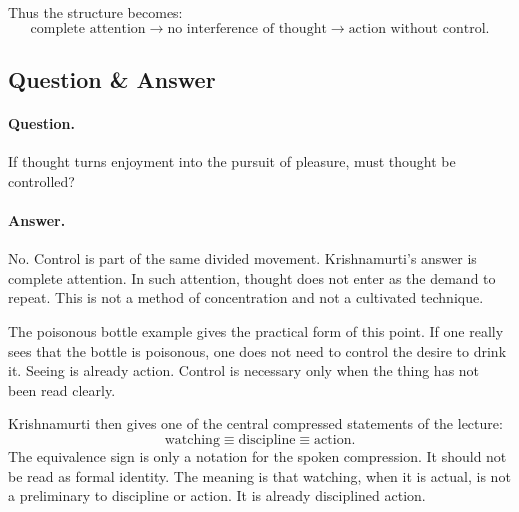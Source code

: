 Thus the structure becomes:
\begin{equation}
\text{complete attention}
\longrightarrow
\text{no interference of thought}
\longrightarrow
\text{action without control}.
\end{equation}

\subsection{Question \& Answer}

\paragraph{Question.}
If thought turns enjoyment into the pursuit of pleasure, must thought be controlled?

\paragraph{Answer.}
No. Control is part of the same divided movement. Krishnamurti's answer is complete attention. In such attention, thought does not enter as the demand to repeat. This is not a method of concentration and not a cultivated technique.

The poisonous bottle example gives the practical form of this point. If one really sees that the bottle is poisonous, one does not need to control the desire to drink it. Seeing is already action. Control is necessary only when the thing has not been read clearly.

Krishnamurti then gives one of the central compressed statements of the lecture:
\begin{equation}
\text{watching} \equiv \text{discipline} \equiv \text{action}.
\end{equation}
The equivalence sign is only a notation for the spoken compression. It should not be read as formal identity. The meaning is that watching, when it is actual, is not a preliminary to discipline or action. It is already disciplined action.


